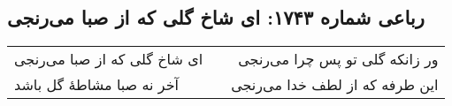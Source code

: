 \begin{center}
\section*{رباعی شماره ۱۷۴۳: ای شاخ گلی که از صبا می‌رنجی}
\label{sec:1743}
\begin{longtable}{l p{0.5cm} r}
ای شاخ گلی که از صبا می‌رنجی
&&
ور زانکه گلی تو پس چرا می‌رنجی
\\
آخر نه صبا مشاطهٔ گل باشد
&&
این طرفه که از لطف خدا می‌رنجی
\\
\end{longtable}
\end{center}
